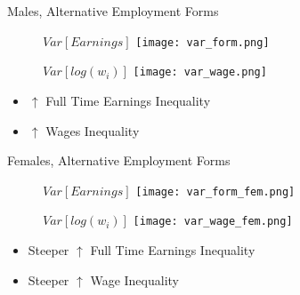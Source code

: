 \documentclass{beamer}
\begin{document}
\begin{frame}{Males, Alternative Employment Forms}
\begin{figure}[!t]
\centering
\begin{minipage}[b]{0.48\textwidth}{$Var[Earnings]$}
\centering
\texttt{[image: var\_form.png]}
\end{minipage}
\begin{minipage}[b]{0.48\textwidth}{$Var[log(w_i)]$}
\centering
\texttt{[image: var\_wage.png]}
\end{minipage}
\end{figure}
\begin{itemize}
\setlength{\itemsep}{0.7 cm}
\item $\uparrow$ Full Time Earnings Inequality
\item $\uparrow$ Wages Inequality
\end{itemize}
\end{frame}

\begin{frame}{Females, Alternative Employment Forms}
\begin{figure}[!t]
\centering
\begin{minipage}[b]{0.48\textwidth}{$Var[Earnings]$}
\centering
\texttt{[image: var\_form\_fem.png]}
\end{minipage}
\begin{minipage}[b]{0.48\textwidth}{$Var[log(w_i)]$}
\centering
\texttt{[image: var\_wage\_fem.png]}
\end{minipage}
\end{figure}
\begin{itemize}
\setlength{\itemsep}{0.7 cm}
\item Steeper $\uparrow$ Full Time Earnings Inequality
\item Steeper $\uparrow$ Wage Inequality
\end{itemize}
\end{frame}
\end{document}
